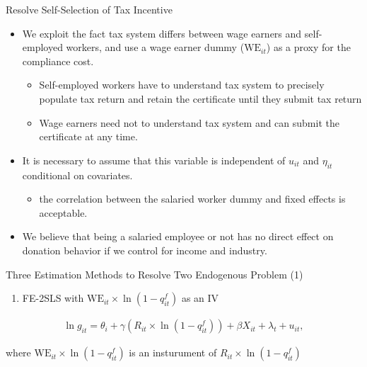 \documentclass[
  ignorenonframetext,
  aspectratio=169,
]{beamer}
\providecommand{\tightlist}{%
  \setlength{\itemsep}{0pt}\setlength{\parskip}{0pt}}
\begin{document}
\begin{frame}{Resolve Self-Selection of Tax Incentive}
\protect\hypertarget{resolve-self-selection-of-tax-incentive}{}
\begin{itemize}
\tightlist
\item
  We exploit the fact tax system differs between wage earners and self-employed workers,
  and use a wage earner dummy (\(\text{WE}_{it}\)) as a proxy for the compliance cost.

  \begin{itemize}
  \tightlist
  \item
    Self-employed workers have to understand tax system to precisely populate tax return and retain the certificate until they submit tax return
  \item
    Wage earners need not to understand tax system and can submit the certificate at any time.
  \end{itemize}
\item
  It is necessary to assume that this variable is independent of \(u_{it}\) and \(\eta_{it}\) conditional on covariates.

  \begin{itemize}
  \tightlist
  \item
    the correlation between the salaried worker dummy and fixed effects is acceptable.
  \end{itemize}
\item
  We believe that being a salaried employee or not has no direct effect on donation behavior if we control for income and industry.
\end{itemize}
\end{frame}

\begin{frame}{Three Estimation Methods to Resolve Two Endogenous Problem (1)}
\protect\hypertarget{three-estimation-methods-to-resolve-two-endogenous-problem-1}{}
\begin{enumerate}
\tightlist
\item
  FE-2SLS with \(\text{WE}_{it} \times \ln(1 - q^f_{it})\) as an IV
\end{enumerate}

\begin{align}
  \ln g_{it} = \theta_i + \gamma (R_{it} \times \ln (1 - q^f_{it}))
    + \beta X_{it} + \lambda_t + u_{it}, \label{eq:intensive2}
\end{align}

where \(\text{WE}_{it} \times \ln(1 - q^f_{it})\) is an insturument of
\(R_{it} \times \ln (1 - q^f_{it})\)
\end{frame}
\end{document}
